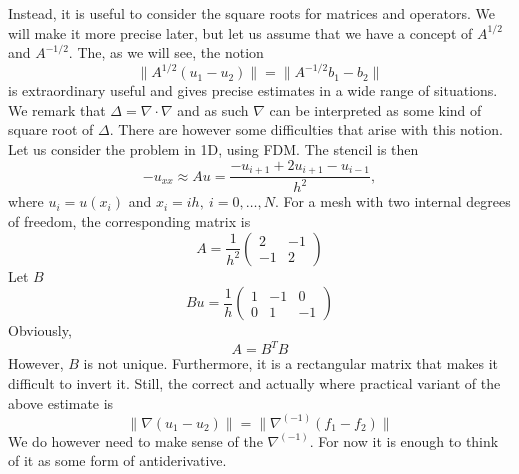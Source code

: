 Instead, it is useful to consider the square roots for matrices and operators. 
We will make it more precise later, but let us assume 
that we have a concept of 
$A^{1/2}$ and $A^{-1/2}$. The, as we will see,  the notion 
\[
\|A^{1/2}(u_1 - u_2) \| = \|A^{-1/2}b_1 - b_2\|     
\]
is extraordinary useful and gives precise estimates in a wide range of situations.  
We remark that $\Delta=\nabla\cdot\nabla$ and as such $\nabla$ can be interpreted
as some kind of square root of $\Delta$. There are however some difficulties that
arise with this notion. Let us consider the problem in 1D, using FDM. The stencil 
is then 
\[
- u_{xx} \approx A u =  \frac{-u_{i+1} + 2 u_{i+1}  -u_{i-1}}{h^2}, 
\]  
where $u_i= u(x_i)$ and $x_i = ih, \ i=0,\ldots, N$. 
For a mesh with two internal degrees of freedom, the corresponding matrix 
is 
\[
A = 
\frac{1}{h^2}\begin{pmatrix}
2 & -1 \\ -1 & 2 
\end{pmatrix}
\]
Let $B$ 
\[
B u = 
\frac{1}{h}\begin{pmatrix}
1 & -1 & 0  \\ 0 & 1 & -1  
\end{pmatrix}
\]
Obviously,  
\[
A = B^T B 
\]
However, $B$ is not unique. Furthermore, it is a rectangular matrix that makes
it difficult to invert it. Still, the correct and actually where practical 
variant of the above estimate is    
\[
\|\nabla (u_1 - u_2) \| = \|\nabla^(-1)(f_1 - f_2)\|     
\]
We do however need to make sense of the 
$\nabla^(-1)$. For now it is enough to think of it as some form of antiderivative. 





